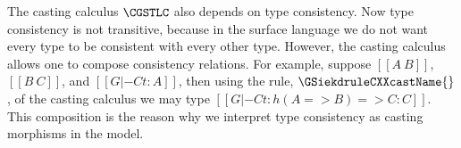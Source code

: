 The casting calculus $\CGSTLC$ also depends on type consistency.  Now
type consistency is not transitive, because in the surface language we
do not want every type to be consistent with every other type.
However, the casting calculus allows one to compose consistency
relations.  For example, suppose $[[A ~ B]]$, $[[B ~ C]]$, and $[[G |-C
    t : A]]$, then using the rule, $\GSiekdruleCXXcastName{}$, of the
casting calculus we may type $[[G |-C t : h({A} => {B}) => {C} : C]]$.  This composition
is the reason why we interpret type consistency as casting morphisms
in the model.

